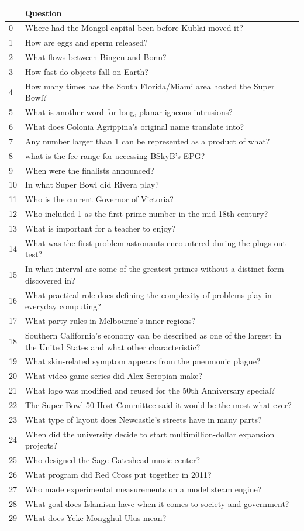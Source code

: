 \begin{tabular}{ll}
\toprule
 & Question \\
\midrule
0 & Where had the Mongol capital been before Kublai moved it? \\
1 & How are eggs and sperm released? \\
2 & What flows between Bingen and Bonn? \\
3 & How fast do objects fall on Earth? \\
4 & How many times has the South Florida/Miami area hosted the Super Bowl? \\
5 & What is another word for long, planar igneous intrusions? \\
6 & What does Colonia Agrippina's original name translate into? \\
7 & Any number larger than 1 can be represented as a product of what? \\
8 & what is the fee range for accessing BSkyB's EPG? \\
9 & When were the finalists announced? \\
10 & In what Super Bowl did Rivera play? \\
11 & Who is the current Governor of Victoria? \\
12 & Who included 1 as the first prime number in the mid 18th century? \\
13 & What is important for a teacher to enjoy? \\
14 & What was the first problem astronauts encountered during the plugs-out test? \\
15 & In what interval are some of the greatest primes without a distinct form discovered in? \\
16 & What practical role does defining the complexity of problems play in everyday computing? \\
17 & What party rules in Melbourne's inner regions? \\
18 & Southern California's economy can be described as one of the largest in the United States and what other characteristic? \\
19 & What skin-related symptom appears from the pneumonic plague? \\
20 & What video game series did Alex Seropian make? \\
21 & What logo was modified and reused for the 50th Anniversary special? \\
22 & The Super Bowl 50 Host Committee said it would be the most what ever? \\
23 & What type of layout does Newcastle's streets have in many parts? \\
24 & When did the university decide to start multimillion-dollar expansion projects? \\
25 & Who designed the Sage Gateshead music center? \\
26 & What program did Red Cross put together in 2011? \\
27 & Who made experimental measurements on a model steam engine? \\
28 & What goal does Islamism have when it comes to society and government? \\
29 & What does Yeke Mongghul Ulus mean? \\
\bottomrule
\end{tabular}
